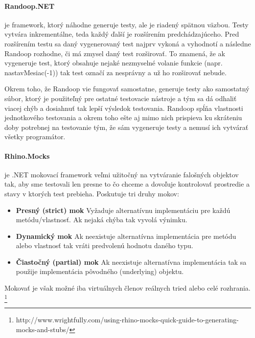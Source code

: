 \documentclass[11pt,twoside,slovak,a4paper]{article}
\begin{document}
		\paragraph{Randoop.NET} je framework, ktorý náhodne generuje testy, ale je riadený spätnou väzbou. Testy vytvára inkrementálne, teda každý ďalší je rozšírením predchádzajúceho. Pred rozšírením testu sa daný vygenerovaný test najprv vykoná a vyhodnotí a následne Randoop rozhodne, či má zmysel daný test rozširovať. To znamená, že ak vygeneruje test, ktorý obsahuje nejaké nezmyselné volanie funkcie (napr. nastavMesiac(-1)) tak test označí za nesprávny a už ho rozširovať nebude.
		
		Okrem toho, že Randoop vie fungovať samostatne, generuje testy ako samostatný súbor, ktorý je použiteľný pre ostatné testovacie nástroje a tým sa dá odhaliť viacej chýb a dosiahnuť tak lepší výsledok testovania.\cite{Pacheco2007}
		Randoop spĺňa vlastnosti jednotkového testovania a okrem toho ešte aj mimo nich prispieva ku skráteniu doby potrebnej na testovanie tým, že sám vygeneruje testy a nemusí ich vytvárať všetky programátor.
		
		\paragraph{Rhino.Mocks} je .NET mokovací framework veľmi užitočný na vytváranie falošných objektov tak, aby sme testovali len presne to čo chceme a dovoľuje kontrolovať prostredie a stavy v ktorých test prebieha.
		Poskutuje tri druhy mokov:
		\begin{itemize}
			\item \textbf{Presný (strict) mok} Vyžaduje alternatívnu implementáciu pre každú metódu/vlastnosť. Ak nejaká chýba tak vyvolá výnimku.
			\item \textbf{Dynamický mok} Ak neexistuje alternatívna implementácia pre metódu alebo vlastnosť tak vráti predvolenú hodnotu daného typu.
			\item \textbf{Čiastočný (partial) mok} Ak neexistuje alternatívna implementácia tak sa použije implementácia pôvodného (underlying) objektu.
		\end{itemize}
		Mokovať je však možné iba virtuálnych členov reálnych tried alebo celé rozhrania. \footnote{http://www.wrightfully.com/using-rhino-mocks-quick-guide-to-generating-mocks-and-stubs/}
		
\end{document}
